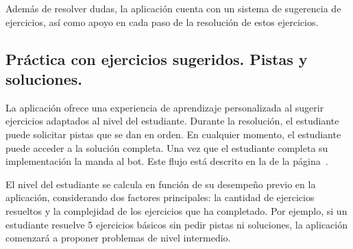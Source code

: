 Además de resolver dudas, la aplicación cuenta con un sistema de sugerencia de ejercicios, así como apoyo en cada paso de la resolución de estos ejercicios.

\subsection{Práctica con ejercicios sugeridos. Pistas y soluciones.}

La aplicación ofrece una experiencia de aprendizaje personalizada al sugerir ejercicios adaptados al nivel del estudiante. Durante la resolución, el estudiante puede solicitar pistas que se dan en orden. En cualquier momento, el estudiante puede acceder a la solución completa. Una vez que el estudiante completa su implementación la manda al bot. Este flujo está descrito en la  de la página~\pageref{fig:exercises}.

El nivel del estudiante se calcula en función de su desempeño previo en la aplicación, considerando dos factores principales: la cantidad de ejercicios resueltos y la complejidad de los ejercicios que ha completado. Por ejemplo, si un estudiante resuelve 5 ejercicios básicos sin pedir pistas ni soluciones, la aplicación comenzará a proponer problemas de nivel intermedio.


